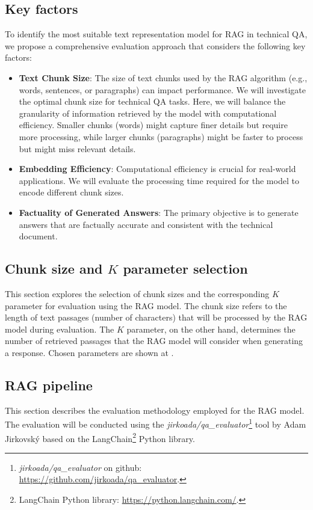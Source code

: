 \subsection{Key factors}
To identify the most suitable text representation model for \ac{RAG} in technical \ac{QA}, we propose a comprehensive evaluation approach that considers the following key factors:

\begin{itemize}
  \item \textbf{Text Chunk Size}:
 The size of text chunks used by the \ac{RAG} algorithm (e.g., words, sentences, or paragraphs) can impact performance.
 We will investigate the optimal chunk size for technical \ac{QA} tasks.
 Here, we will balance the granularity of information retrieved by the model with computational efficiency.
 Smaller chunks (words) might capture finer details but require more processing, while larger chunks (paragraphs) might be faster to process but might miss relevant details.  
  \item \textbf{Embedding Efficiency}:
 Computational efficiency is crucial for real-world applications.
 We will evaluate the processing time required for the model to encode different chunk sizes.
  \item \textbf{Factuality of Generated Answers}:
 The primary objective is to generate answers that are factually accurate and consistent with the technical document.
\end{itemize}

\subsection{Chunk size and $K$ parameter selection}
This section explores the selection of chunk sizes and the corresponding $K$ parameter for evaluation using the \ac{RAG} model.
The chunk size refers to the length of text passages (number of characters) that will be processed by the \ac{RAG} model during evaluation.
The $K$ parameter, on the other hand, determines the number of retrieved passages that the \ac{RAG} model will consider when generating a response.
Chosen parameters are shown at .



\subsection{\ac{RAG} pipeline}

This section describes the evaluation methodology employed for the \ac{RAG} model.
The evaluation will be conducted using the \textit{jirkoada/qa\_evaluator}\footnote{\textit{jirkoada/qa\_evaluator} on github: \url{https://github.com/jirkoada/qa_evaluator}.} tool by Adam Jirkovský based on the LangChain\footnote{LangChain Python library: \url{https://python.langchain.com/}.} Python library.

